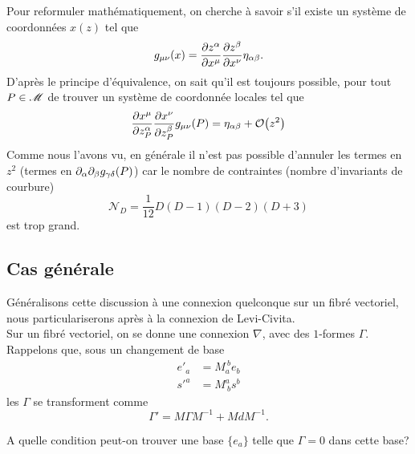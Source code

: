 \documentclass[a4paper,11pt]{report}
\begin{document}
            Pour reformuler mathématiquement, on cherche à savoir s'il existe un système de coordonnées $x(z)$ tel que
            \begin{equation}
                g_{\mu\nu}(x) = \pdv{z^\alpha}{x^\mu}\pdv{z^\beta}{x^\nu}\eta_{\alpha\beta}.
            \end{equation}
            D'après le principe d'équivalence, on sait qu'il est toujours possible, pour tout $P\in\mathscr{M}$ de trouver un système de coordonnée locales tel que
            \begin{equation}
                \pdv{x^\mu}{z^\alpha_P}\pdv{x^\nu}{z^\beta_P}g_{\mu\nu}(P) = \eta_{\alpha\beta} + \order{z^2}
            \end{equation}
            Comme nous l'avons vu, en générale il n'est pas possible d'annuler les termes en $z^2$ (termes en $\partial_\alpha\partial_\beta g_{\gamma\delta}(P)$) car le nombre de contraintes (nombre d'invariants de courbure)
            \begin{equation}
                \mathscr{N}_D = \frac{1}{12}D(D-1)(D-2)(D+3)
            \end{equation}
            est trop grand.
            
            \subsection{Cas générale}
            
                Généralisons cette discussion à une connexion quelconque sur un fibré vectoriel, nous particulariserons après à la connexion de Levi-Civita.\\
                
                Sur un fibré vectoriel, on se donne une connexion $\nabla$, avec des $1$-formes $\Gamma$. Rappelons que, sous un changement de base
                \begin{align}
                    e'_a &= M_a^{~b}e_b \\
                    s'^a &= M^a_{~b}s^b
                \end{align}
                les $\Gamma$ se transforment comme
                \begin{equation}
                    \Gamma' = M\Gamma M^{-1} + MdM^{-1}.
                \end{equation}
                
                A quelle condition peut-on trouver une base $\{e_a\}$ telle que $\Gamma = 0$ dans cette base?
                
\end{document}
